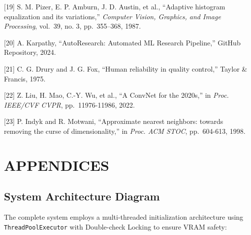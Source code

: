 \documentclass[12pt, a4paper, oneside]{report}
\begin{document}
{[}19{]} S. M. Pizer, E. P. Amburn, J. D. Austin, et al., ``Adaptive histogram equalization and its variations,'' \emph{Computer Vision, Graphics, and Image Processing}, vol.~39, no. 3, pp.~355--368, 1987.

{[}20{]} A. Karpathy, ``AutoResearch: Automated ML Research Pipeline,'' GitHub Repository, 2024.

{[}21{]} C. G. Drury and J. G. Fox, ``Human reliability in quality control,'' Taylor \& Francis, 1975.

{[}22{]} Z. Liu, H. Mao, C.-Y. Wu, et al., ``A ConvNet for the 2020s,'' in \emph{Proc. IEEE/CVF CVPR}, pp.~11976-11986, 2022.

{[}23{]} P. Indyk and R. Motwani, ``Approximate nearest neighbors: towards removing the curse of dimensionality,'' in \emph{Proc. ACM STOC}, pp.~604-613, 1998.

\bigskip\noindent\hrulefill\bigskip

\chapter*{APPENDICES}
\label{appendices}

\section{\1 System Architecture Diagram}\label{appendix-a-system-architecture-diagram}

The complete system employs a multi-threaded initialization architecture using \texttt{ThreadPoolExecutor} with Double-check Locking to ensure VRAM safety:
\end{document}
